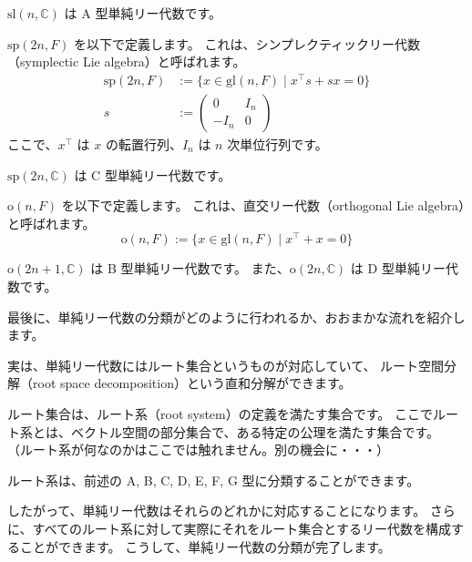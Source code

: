\documentclass{ltjsarticle}
\begin{document}
\begin{usmexample}[A型単純リー代数]
    \(\mathrm{sl}(n,\mathbb{C})\) は A 型単純リー代数です。
\end{usmexample}

\begin{usmexample}[C型単純リー代数]
    \(\mathrm{sp}(2n,F)\) を以下で定義します。
    これは、シンプレクティックリー代数（symplectic Lie algebra）と呼ばれます。
    \begin{align*}
        \mathrm{sp}(2n,F) & := \{x \in \mathrm{gl}(n,F) \mid x^{\intercal}s + sx = 0\} \\
        s                 & := \begin{pmatrix}
            0     & I_n \\
            - I_n & 0
        \end{pmatrix}
    \end{align*}
    ここで、\(x^{\intercal}\) は \(x\) の転置行列、\(I_n\) は \(n\) 次単位行列です。

    \(\mathrm{sp}(2n,\mathbb{C})\) は C 型単純リー代数です。
\end{usmexample}

\begin{usmexample}[B型およびD型単純リー代数]
    \(\mathrm{o}(n,F)\) を以下で定義します。
    これは、直交リー代数（orthogonal Lie algebra）と呼ばれます。
    \[
        \mathrm{o}(n,F) := \{x \in \mathrm{gl}(n,F) \mid  x^{\intercal} + x = 0\}
    \]

    \(\mathrm{o}(2n+1,\mathbb{C})\) は B 型単純リー代数です。
    また、\(\mathrm{o}(2n,\mathbb{C})\) は D 型単純リー代数です。
\end{usmexample}

最後に、単純リー代数の分類がどのように行われるか、おおまかな流れを紹介します。

実は、単純リー代数にはルート集合というものが対応していて、
ルート空間分解（root space decomposition）という直和分解ができます。

ルート集合は、ルート系（root system）の定義を満たす集合です。
ここでルート系とは、ベクトル空間の部分集合で、ある特定の公理を満たす集合です。
（ルート系が何なのかはここでは触れません。別の機会に・・・）

ルート系は、前述の A, B, C, D, E, F, G 型に分類することができます。

したがって、単純リー代数はそれらのどれかに対応することになります。
さらに、すべてのルート系に対して実際にそれをルート集合とするリー代数を構成することができます。
こうして、単純リー代数の分類が完了します。
\end{document}
